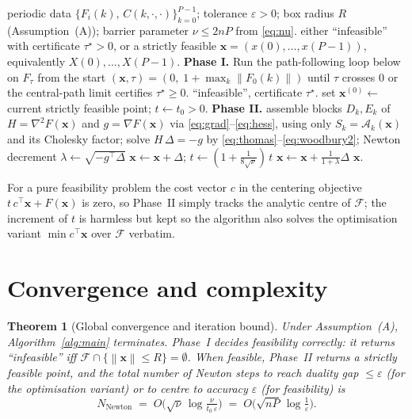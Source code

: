 \documentclass{amsart}
\newtheorem{theorem}{Theorem}
\newcommand{\norm}[1]{\left\lVert#1\right\rVert}
\begin{document}
\begin{algorithm}[t]
\caption{Periodic-structure interior-point solver for PLMI}
\label{alg:main}
\begin{algorithmic}[1]
\Require periodic data $\{F_i(k),\,C(k,\cdot,\cdot)\}_{k=0}^{P-1}$; tolerance
         $\varepsilon>0$; box radius $R$ (Assumption~(A)); barrier parameter
         $\nu\le 2nP$ from \eqref{eq:nu}.
\Ensure either ``infeasible'' with certificate $\tau^\star>0$, or a strictly
         feasible $\bm x=(x(0),\dots,x(P-1))$, equivalently $X(0),\dots,X(P-1)$.
\State \textbf{Phase I.} Run the path-following loop below on $F_\tau$ from the start
       $(\bm x,\tau)=(0,\;1+\max_k\norm{F_0(k)})$ until $\tau$ crosses $0$ or the
       central-path limit certifies $\tau^\star\ge0$.
 \State \Return ``infeasible'', certificate $\tau^\star$.
\Else \State set $\bm x^{(0)}\gets$ current strictly feasible point; $t\gets t_0>0$.
\EndIf
\State \textbf{Phase II.}
  \State assemble blocks $D_k,E_k$ of $H=\nabla^2F(\bm x)$ and $g=\nabla F(\bm x)$
         via \eqref{eq:grad}--\eqref{eq:hess}, using only $S_k=\mathcal A_k(\bm x)$ and
         its Cholesky factor; 
  \State solve $H\,\Delta=-g$ by \eqref{eq:thomas}--\eqref{eq:woodbury2};
  \State Newton decrement $\lambda\gets\sqrt{-g^{\!\top}\Delta}$
   \State $\bm x\gets\bm x+\Delta$; $t\gets(1+\tfrac{1}{8\sqrt{\nu}})\,t$
  \Else \State $\bm x\gets\bm x+\tfrac{1}{1+\lambda}\Delta$ 
  \EndIf
\EndWhile
\State \Return $\bm x$.
\end{algorithmic}
\end{algorithm}

For a pure feasibility problem the cost vector $c$ in the centering objective
$t\,c^{\!\top}\bm x+F(\bm x)$ is zero, so Phase~II simply tracks the analytic centre of
$\mathcal F$; the increment of $t$ is harmless but kept so the algorithm also solves
the optimisation variant $\min c^{\!\top}\bm x$ over $\mathcal F$ verbatim.

\section{Convergence and complexity}\label{sec:conv}

\begin{theorem}[Global convergence and iteration bound]\label{thm:conv}
Under Assumption~(A), Algorithm~\ref{alg:main} terminates. Phase~I decides
feasibility correctly: it returns ``infeasible'' iff $\mathcal F\cap\{\norm{\bm
x}\le R\}=\emptyset$. When feasible, Phase~II returns a strictly feasible point, and
the total number of Newton steps to reach duality gap $\le\varepsilon$ (for the
optimisation variant) or to centre to accuracy $\varepsilon$ (for feasibility) is
\begin{equation}\label{eq:itbound}
  N_{\mathrm{Newton}}
  \;=\;O\!\Big(\sqrt{\nu}\,\log\tfrac{\nu}{t_0\,\varepsilon}\Big)
  \;=\;O\!\Big(\sqrt{nP}\,\log\tfrac{1}{\varepsilon}\Big).
\end{equation}
\end{theorem}
\end{document}
